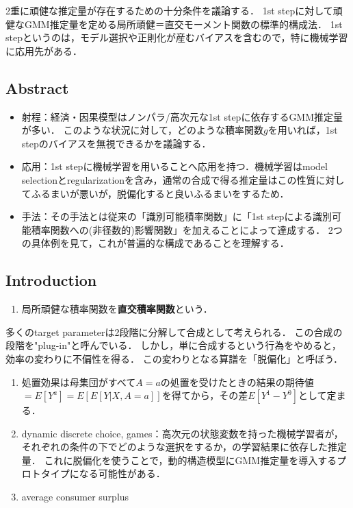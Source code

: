 \documentclass[uplatex,dvipdfmx]{jsreport}
\begin{document}
\begin{tcolorbox}[colframe=ForestGreen, colback=ForestGreen!10!white,breakable,colbacktitle=ForestGreen!40!white,coltitle=black,fonttitle=\bfseries\sffamily,
title=]
    2重に頑健な推定量が存在するための十分条件を議論する．
    1st stepに対して頑健なGMM推定量を定める局所頑健＝直交モーメント関数の標準的構成法．
    1st stepというのは，モデル選択や正則化が産むバイアスを含むので，特に機械学習に応用先がある．
\end{tcolorbox}

\subsection{Abstract}

\begin{itemize}
    \item 射程：経済・因果模型はノンパラ/高次元な1st stepに依存するGMM推定量が多い．
    このような状況に対して，どのような積率関数$g$を用いれば，1st stepのバイアスを無視できるかを議論する．
    \item 応用：1st stepに機械学習を用いることへ応用を持つ．機械学習はmodel selectionとregularizationを含み，通常の合成で得る推定量はこの性質に対してふるまいが悪いが，脱偏化すると良いふるまいをするため．
    \item 手法：その手法とは従来の「識別可能積率関数」に「1st stepによる識別可能積率関数への(非径数的)影響関数」を加えることによって達成する．
    2つの具体例を見て，これが普遍的な構成であることを理解する．
\end{itemize}

\subsection{Introduction}

\begin{notation}\mbox{}
    \begin{enumerate}
        \item 局所頑健な積率関数を\textbf{直交積率関数}という．
    \end{enumerate}
\end{notation}

\begin{example}
    多くのtarget parameterは2段階に分解して合成として考えられる．
    この合成の段階を"plug-in"と呼んでいる．
    しかし，単に合成するという行為をやめると，効率の変わりに不偏性を得る．
    この変わりとなる算譜を「脱偏化」と呼ぼう．
    \begin{enumerate}
        \item 処置効果は母集団がすべて$A=a$の処置を受けたときの結果の期待値$=E[Y^a]=E[E[Y|X,A=a]]$を得てから，その差$E[Y^1-Y^0]$として定まる．
        \item dynamic discrete choice, games：高次元の状態変数を持った機械学習者が，それぞれの条件の下でどのような選択をするか，の学習結果に依存した推定量．
        これに脱偏化を使うことで，動的構造模型にGMM推定量を導入するプロトタイプになる可能性がある．
        \item average consumer surplus
    \end{enumerate}
\end{example}
\end{document}
